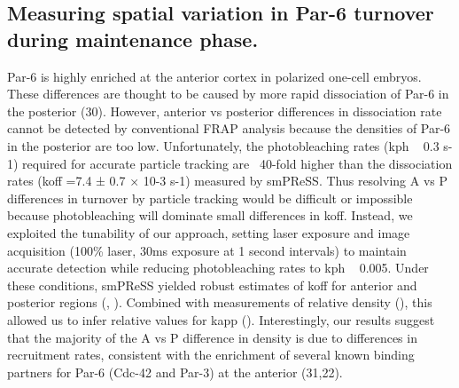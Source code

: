  
 \subsection{Measuring spatial variation in Par-6 turnover during maintenance phase.}
 
 Par-6 is highly enriched at the anterior cortex in polarized one-cell embryos. These differences are thought to be caused by more rapid dissociation of Par-6 in the posterior (30). However, anterior vs posterior differences in dissociation rate cannot be detected by conventional FRAP analysis because the densities of Par-6 in the posterior are too low. Unfortunately, the photobleaching rates (kph ~ 0.3 s-1) required for accurate particle tracking are ~40-fold higher than the dissociation rates (koff =7.4 ± 0.7 × 10-3 s-1) measured by smPReSS. Thus resolving A vs P differences in turnover by particle tracking would be difficult or impossible because photobleaching will dominate small differences in koff. Instead, we exploited the tunability of our approach, setting laser exposure and image acquisition (100\% laser, 30ms exposure at 1 second intervals) to maintain accurate detection while reducing photobleaching rates to kph ~ 0.005. Under these conditions, smPReSS yielded robust estimates of koff for anterior and posterior regions (, ). Combined with measurements of relative density (), this allowed us to infer relative values for kapp (). Interestingly, our results suggest that the majority of the A vs P difference in density is due to differences in recruitment rates, consistent with the enrichment of several known binding partners for Par-6 (Cdc-42 and Par-3) at the anterior (31,22).
 
 
 
